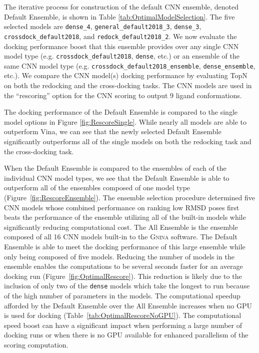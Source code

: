 \documentclass[journal=jcisd8,manuscript=article]{achemso}
\begin{document}
The iterative process for construction of the default CNN ensemble, denoted Default Ensemble, is shown in Table \ref{tab:OptimalModelSelection}. The five selected models are \texttt{dense\_4}, \texttt{general\_default2018\_3}, \texttt{dense\_3}, \texttt{crossdock\_default2018}, and \texttt{redock\_default2018\_2}. We now evaluate the docking performance boost that this ensemble provides over any single CNN model type (e.g. \texttt{crossdock\_default2018}, \texttt{dense}, etc.) or an ensemble of the same CNN model type (e.g. \texttt{crossdock\_default2018\_ensemble}, \texttt{dense\_ensemble}, etc.). We compare the CNN model(s) docking performance by evaluating TopN on both the redocking and the cross-docking tasks. The CNN models are used in the ``rescoring'' option for the CNN scoring to output 9 ligand conformations. 

The docking performance of the Default Ensemble is compared to the single model options in Figure \ref{fig:RescoreSingle}. While nearly all models are able to outperform Vina, we can see that the newly selected Default Ensemble significantly outperforms all of the single models on both the redocking task and the cross-docking task.

When the Default Ensemble is compared to the ensembles of each of the individual CNN model types, we see that the Default Ensemble is able to outperform all of the ensembles composed of one model type (Figure~\ref{fig:RescoreEnsemble}). The ensemble selection procedure determined five CNN models whose combined performance on ranking low RMSD poses first beats the performance of the ensemble utilizing all of the built-in models while significantly reducing computational cost. The All Ensemble is the ensemble composed of all 16 CNN models built-in to the \textsc{Gnina} software. The Default Ensemble is able to meet the docking performance of this large ensemble while only being composed of five models. Reducing the number of models in the ensemble enables the computations to be several seconds faster for an average docking run (Figure~\ref{fig:OptimalRescore}). This reduction is likely due to the inclusion of only two of the \texttt{dense} models which take the longest to run because of the high number of parameters in the models. The computational speedup afforded by the Default Ensemble over the All Ensemble increases when no GPU is used for docking (Table~\ref{tab:OptimalRescoreNoGPU}). The computational speed boost can have a significant impact when performing a large number of docking runs or when there is no GPU available for enhanced parallelism of the scoring computation.
\end{document}

